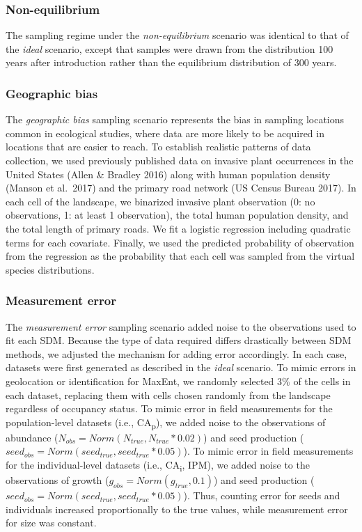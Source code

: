\documentclass[]{article}
\begin{document}
\subsubsection{Non-equilibrium}

The sampling regime under the \emph{non-equilibrium} scenario was
identical to that of the \emph{ideal} scenario, except that samples were
drawn from the distribution 100 years after introduction rather than the
equilibrium distribution of 300 years.

\subsubsection{Geographic bias}

The \emph{geographic bias} sampling scenario represents the bias in
sampling locations common in ecological studies, where data are more
likely to be acquired in locations that are easier to reach. To
establish realistic patterns of data collection, we used previously
published data on invasive plant occurrences in the United States (Allen
\& Bradley 2016) along with human population density (Manson et
al.~2017) and the primary road network (US Census Bureau 2017). In each
cell of the landscape, we binarized invasive plant observation (0: no
observations, 1: at least 1 observation), the total human population
density, and the total length of primary roads. We fit a logistic
regression including quadratic terms for each covariate. Finally, we
used the predicted probability of observation from the regression as the
probability that each cell was sampled from the virtual species
distributions.

\subsubsection{Measurement error}

The \emph{measurement error} sampling scenario added noise to the
observations used to fit each SDM. Because the type of data required
differs drastically between SDM methods, we adjusted the mechanism for
adding error accordingly. In each case, datasets were first generated as
described in the \emph{ideal} scenario. To mimic errors in geolocation
or identification for MaxEnt, we randomly selected 3\% of the cells in
each dataset, replacing them with cells chosen randomly from the
landscape regardless of occupancy status. To mimic error in field
measurements for the population-level datasets (i.e.,
CA\textsubscript{p}), we added noise to the observations of abundance
(\(N_{obs} = Norm(N_{true}, N_{true}*0.02)\)) and seed production
(\(seed_{obs} = Norm(seed_{true}, seed_{true}*0.05)\)). To mimic error
in field measurements for the individual-level datasets (i.e.,
CA\textsubscript{i}, IPM), we added noise to the observations of growth
(\(g_{obs} = Norm(g_{true}, 0.1)\)) and seed production
(\(seed_{obs} = Norm(seed_{true}, seed_{true}*0.05)\)). Thus, counting
error for seeds and individuals increased proportionally to the true
values, while measurement error for size was constant.
\end{document}
